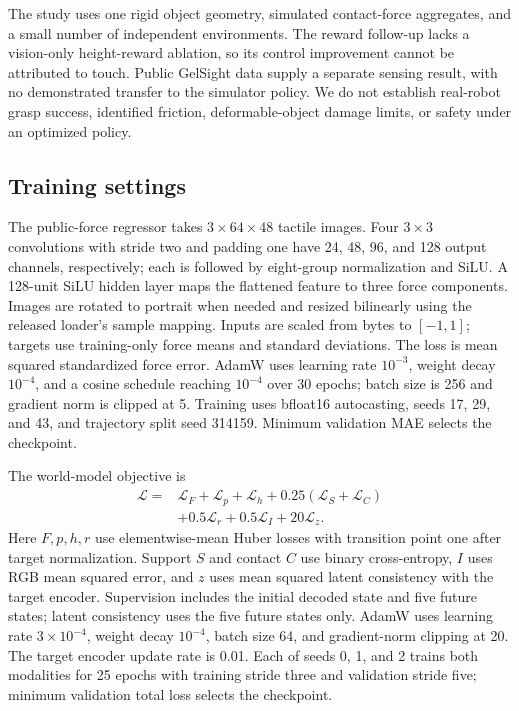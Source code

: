 \documentclass[letterpaper,10pt,conference]{ieeeconf}
\begin{document}
The study uses one rigid object geometry, simulated contact-force aggregates, and a small number of independent environments. The reward follow-up lacks a vision-only height-reward ablation, so its control improvement cannot be attributed to touch. Public GelSight data supply a separate sensing result, with no demonstrated transfer to the simulator policy. We do not establish real-robot grasp success, identified friction, deformable-object damage limits, or safety under an optimized policy.

\label{sec:implementation}

\subsection{Training settings}
The public-force regressor takes $3\times64\times48$ tactile images. Four
$3\times3$ convolutions with stride two and padding one have 24, 48, 96,
and 128 output channels, respectively; each is followed by eight-group
normalization and SiLU. A 128-unit SiLU hidden layer maps the flattened
feature to three force components. Images are rotated to portrait when
needed and resized bilinearly using the released loader's sample mapping.
Inputs are scaled from bytes to $[-1,1]$; targets use training-only force
means and standard deviations. The loss is mean squared standardized force
error. AdamW uses learning rate $10^{-3}$, weight decay $10^{-4}$, and a
cosine schedule reaching $10^{-4}$ over 30 epochs; batch size is 256 and
gradient norm is clipped at 5. Training uses bfloat16 autocasting, seeds
17, 29, and 43, and trajectory split seed 314159. Minimum validation MAE
selects the checkpoint.

The world-model objective is
\begin{equation}
\begin{aligned}
\mathcal L={}&\mathcal L_F+\mathcal L_p+\mathcal L_h
+0.25(\mathcal L_S+\mathcal L_C)\\
&+0.5\mathcal L_r+0.5\mathcal L_I+20\mathcal L_z.
\end{aligned}
\end{equation}
Here $F,p,h,r$ use elementwise-mean Huber losses with transition point one
after target normalization. Support $S$ and contact $C$ use binary
cross-entropy, $I$ uses RGB mean squared error, and $z$ uses mean squared
latent consistency with the target encoder. Supervision includes the
initial decoded state and five future states; latent consistency uses the
five future states only. AdamW uses learning rate $3\times10^{-4}$,
weight decay $10^{-4}$, batch size 64, and gradient-norm clipping at 20.
The target encoder update rate is 0.01. Each of seeds 0, 1, and 2 trains
both modalities for 25 epochs with training stride three and validation
stride five; minimum validation total loss selects the checkpoint.
\end{document}
